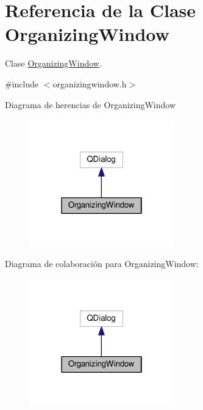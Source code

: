 \hypertarget{class_organizing_window}{}\section{Referencia de la Clase Organizing\+Window}
\label{class_organizing_window}


Clase \hyperlink{class_organizing_window}{Organizing\+Window}.  




{\ttfamily \#include $<$organizingwindow.\+h$>$}



Diagrama de herencias de Organizing\+Window\nopagebreak
\begin{figure}[H]
\begin{center}
\leavevmode
\includegraphics[width=178pt]{class_organizing_window__inherit__graph}
\end{center}
\end{figure}


Diagrama de colaboración para Organizing\+Window\+:\nopagebreak
\begin{figure}[H]
\begin{center}
\leavevmode
\includegraphics[width=178pt]{class_organizing_window__coll__graph}
\end{center}
\end{figure}
